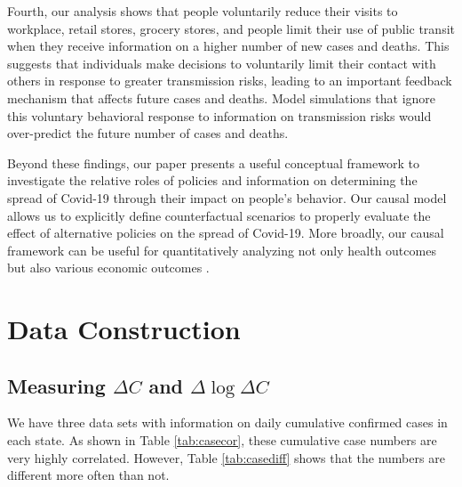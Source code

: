 \documentclass[11pt,reqno,letter]{amsart}
\theoremstyle{definition}
\begin{document}
Fourth, our analysis shows that people voluntarily reduce their visits to workplace, retail stores, grocery stores, and people limit their use of public transit when they receive  information on a higher number of new cases and deaths. This suggests that individuals make decisions to voluntarily limit their contact with others in response to greater transmission risks, leading to an important feedback mechanism that affects future cases and deaths. Model simulations that ignore this voluntary behavioral response to information on transmission risks would over-predict the future number of cases and deaths.

Beyond these findings, our paper presents a useful conceptual framework to investigate the relative roles of policies and information on determining the spread of Covid-19 through their impact on people's behavior. Our causal model allows us  to explicitly define counterfactual scenarios to properly evaluate the effect of alternative policies on the spread of Covid-19. %
 More broadly, our  causal framework can be useful for quantitatively analyzing not only health outcomes but also various economic outcomes \citep{bartik2020, chetty2020real}.





\FloatBarrier

\begin{footnotesize}




\end{footnotesize}


\newpage

\appendix

\section{Data Construction}


\subsection{Measuring $\Delta C$ and $\Delta\log \Delta C$}

We have three data sets with information on daily cumulative confirmed
cases in each state. As shown in Table \ref{tab:casecor}, these
cumulative case numbers are very highly correlated. However, Table
\ref{tab:casediff} shows that the numbers are different more often
than not.
\end{document}
